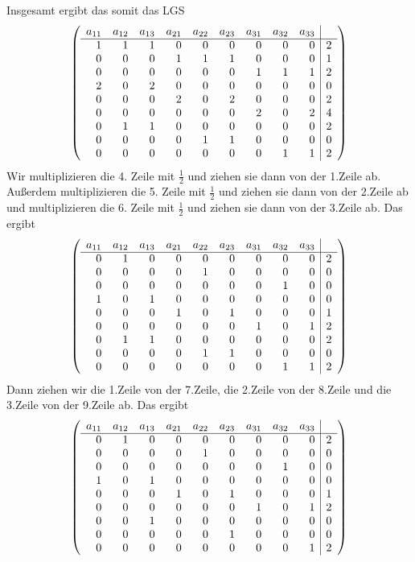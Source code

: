 Insgesamt ergibt das somit das LGS
$$
	\left(
		\begin{array}{rrrrrrrrr | r}
			a_{11} & a_{12} & a_{13}&a_{21}&a_{22}&a_{23}&a_{31}&a_{32}&a_{33}&\\
			\hline
			1&1&1&0&0&0&0&0&0&2\\
			0&0&0&1&1&1&0&0&0&1\\
			0&0&0&0&0&0&1&1&1&2\\
			2&0&2&0&0&0&0&0&0&0\\
			0&0&0&2&0&2&0&0&0&2\\
			0&0&0&0&0&0&2&0&2&4\\
			0&1&1&0&0&0&0&0&0&2\\
			0&0&0&0&1&1&0&0&0&0\\
			0&0&0&0&0&0&0&1&1&2\\
		\end{array}
	\right)
$$
Wir multiplizieren die 4. Zeile mit $\frac{1}{2}$ und ziehen sie dann von der 1.Zeile ab. Außerdem multiplizieren die 5. Zeile mit $\frac{1}{2}$ und ziehen sie dann von der 2.Zeile ab und multiplizieren die 6. Zeile mit $\frac{1}{2}$ und ziehen sie dann von der 3.Zeile ab. Das ergibt
$$
	\left(
		\begin{array}{rrrrrrrrr | r}
			a_{11} & a_{12} & a_{13}&a_{21}&a_{22}&a_{23}&a_{31}&a_{32}&a_{33}&\\
			\hline
			0&1&0&0&0&0&0&0&0&2\\
			0&0&0&0&1&0&0&0&0&0\\
			0&0&0&0&0&0&0&1&0&0\\
			1&0&1&0&0&0&0&0&0&0\\
			0&0&0&1&0&1&0&0&0&1\\
			0&0&0&0&0&0&1&0&1&2\\
			0&1&1&0&0&0&0&0&0&2\\
			0&0&0&0&1&1&0&0&0&0\\
			0&0&0&0&0&0&0&1&1&2\\
		\end{array}
	\right)
$$
Dann ziehen wir die 1.Zeile von der 7.Zeile, die 2.Zeile von der 8.Zeile und die 3.Zeile von der 9.Zeile ab. Das ergibt
$$
	\left(
		\begin{array}{rrrrrrrrr | r}
			a_{11} & a_{12} & a_{13}&a_{21}&a_{22}&a_{23}&a_{31}&a_{32}&a_{33}&\\
			\hline
			0&1&0&0&0&0&0&0&0&2\\
			0&0&0&0&1&0&0&0&0&0\\
			0&0&0&0&0&0&0&1&0&0\\
			1&0&1&0&0&0&0&0&0&0\\
			0&0&0&1&0&1&0&0&0&1\\
			0&0&0&0&0&0&1&0&1&2\\
			0&0&1&0&0&0&0&0&0&0\\
			0&0&0&0&0&1&0&0&0&0\\
			0&0&0&0&0&0&0&0&1&2\\
		\end{array}
	\right)
$$
